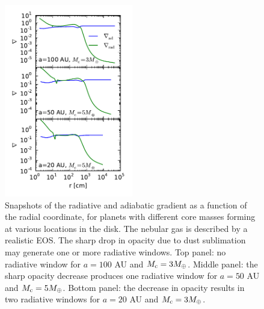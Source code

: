 \documentclass[apj]{emulateapj}
\newcommand{\co}{_{\rm c}}
\begin{document}
\begin{figure}[h!]
\centering
\includegraphics[width=0.5\textwidth]{../../figs/ModelAtmospheres/RadSelfGravRealEOS/PaperFigs/del_vs_r.pdf}
\caption{Snapshots of the radiative and adiabatic gradient as a function of the radial coordinate, for planets with different core masses forming at various locations in the disk. The nebular gas is described by a realistic EOS. The sharp drop in opacity due to dust sublimation may generate one or more radiative windows. Top panel: no radiative window for $a=100$ AU and $M\co=3 M_{\oplus}$. Middle panel: the sharp opacity decrease produces one radiative window for $a=50$ AU and $M\co=5 M_{\oplus}$. Bottom panel: the decrease in opacity results in two radiative windows for $a=20$ AU and $M\co=3 M_{\oplus}$.}
\label{fig:delvsr}
\end{figure}
\end{document}
